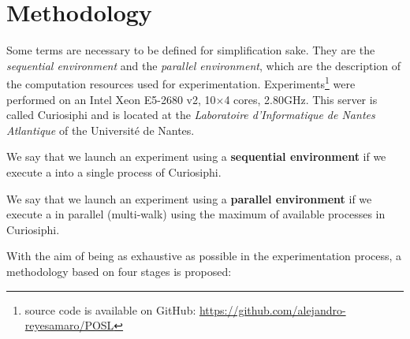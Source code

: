 \section{Methodology}

Some terms are necessary to be defined for simplification sake. They are the \textit{sequential environment} and the \textit{parallel environment}, which are the description of the computation resources used for experimentation. Experiments\footnote{\posl{} source code is available on GitHub: \href{https://github.com/alejandro-reyesamaro/POSL}{https://github.com/alejandro-reyesamaro/POSL}} 
were performed on an Intel\R{} Xeon\TM{} E5-2680 v2, 10$\times$4 cores, 2.80GHz. This server is called {\sc Curiosiphi} and is located at the  \textit{Laboratoire d'Informatique de Nantes Atlantique} of the Université de Nantes. %

\begin{definition}\label{def:seq_envir}
We say that we launch an experiment using a \textbf{sequential environment} if we execute a \soset{} into a single process of {\sc Curiosiphi}.
\end{definition}

\begin{definition}\label{def:par_envir}
We say that we launch an experiment using a \textbf{parallel environment} if we execute a \soset{} in parallel (multi-walk) using the maximum of available processes in {\sc Curiosiphi}.
\end{definition}


With the aim of being as exhaustive as possible in the experimentation process, a methodology based on four stages is proposed:

